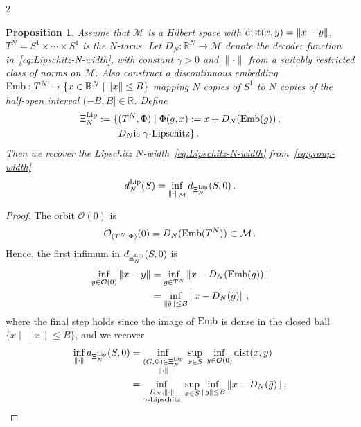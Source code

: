 \documentclass{article}
\newtheorem{proof}{Proof}[theorem]
\newtheorem{proposition}[theorem]{Proposition}
\newcommand{\M}{\mathcal{M}}                                %
\newcommand{\R}{\mathbb{R}}                                 %
\newcommand{\state}{x}
\begin{document}
\begin{multicols}{2}
\begin{proposition}
    Assume that $\M$ is a Hilbert space with $\textnormal{dist}(x,y) = \|x - y\|$, $T^N = S^1 \times \cdots \times S^1$ is the $N$-torus. Let $D_N:\R^N \rightarrow \M$ denote the decoder function in~\eqref{eq:Lipschitz-N-width}, with constant $\gamma > 0$ and $\|\cdot\|$ from a suitably restricted class of norms on $\M$. Also construct a discontinuous embedding $\textnormal{Emb}:T^N \rightarrow \{x \in \R^N \;|\; \|x\|\leq B\}$ mapping $N$ copies of $S^1$ to $N$ copies of the half-open interval $(-B,B] \in \R$. Define  
    \begin{align}\label{eq:Xi-Lip}
        \Xi^{\textnormal{Lip}}_N := \{&(T^N,\Phi)\;|\; \Phi(g,x) := x+D_N(\textnormal{Emb}(g))\,, \\ 
        & D_N \textnormal{is } \gamma\textnormal{-Lipschitz} \}\,. \nonumber
    \end{align}
    Then we recover the Lipschitz $N$-width~\eqref{eq:Lipschitz-N-width} from~\eqref{eq:group-width}
    \begin{equation}
        d^{\textnormal{Lip}}_N(S) = \inf_{\|\cdot\|_{\M}} d_{\Xi^\textnormal{Lip}_N}(S,0)\,.
    \end{equation}
\end{proposition}
\begin{proof}
    The orbit $\mathcal{O}(0)$ is 
    \begin{equation}
        \mathcal{O}_{(T^N,\Phi)}(0) = D_N(\textnormal{Emb}(T^N)) \subset \M \,.
    \end{equation}
    Hence, the first infimum in $d_{\Xi^\textnormal{Lip}_N}(S,0)$ %
    is 
    \begin{align}
        \inf_{y \in \mathcal{O}(0)}\| x - y\| &= \inf_{g \in T^N}\| x - D_N(\textnormal{Emb}(g))\| \\ &= \inf_{\|\bar{g}\|\leq B}\| x - D_N(\bar{g})\| \,,
    \end{align} 
    where the final step holds since the image of $\textnormal{Emb}$ is dense in the closed ball $\{x\;|\; \|x\| \leq B \}$, and we recover
    \begin{align}
        \inf_{\|\cdot\|} d_{\Xi^\textnormal{Lip}_N}(S,0)
         & = \inf_{\substack{(G,\Phi) \in \Xi^{\textnormal{Lip}}_N \\ \|\cdot\|}}\; \sup_{\state \in S}\; \inf_{y \in \mathcal{O}(0)} \textnormal{dist}(\state,y) \\
         & = \inf_{\substack{D_N, \|\cdot\| \\
         \gamma\textnormal{-Lipschitz}}}\; \sup_{\state \in S} \inf_{\|\bar{g}\| \leq B} \| x - D_N(\bar{g}) \| \,,

\end{align}
\end{proof}
\end{multicols}
\end{document}
